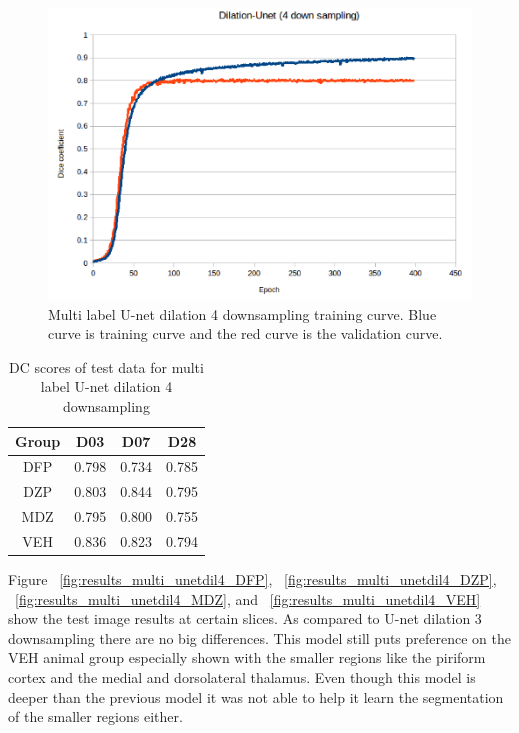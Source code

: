 \begin{figure}[!tbh]
\centering
\includegraphics[width=\textwidth]{results/train_results_multi_unetdil4.png}
\caption{Multi label U-net dilation 4 downsampling training curve. Blue curve is training curve and the red curve is the validation curve. }
\label{fig:results_multi_unetdil4_train}
\end{figure}

\begin{table}[tbh]
\renewcommand{\arraystretch}{1}
\centering
\begin{tabular}{|c|c|c|c|}
\hline
\textbf{Group} & \textbf{D03}& \textbf{D07}& \textbf{D28}\\
\hline
DFP & 0.798 & 0.734 & 0.785\\      
\hline
DZP & 0.803 & 0.844 & 0.795\\
\hline
MDZ & 0.795 & 0.800 & 0.755\\ 
\hline
VEH & 0.836 & 0.823 & 0.794\\ 
\hline
\end{tabular}
\caption{DC scores of test data for multi label U-net dilation 4 downsampling}
\label{tab.multi_model_results_unetdil4}
\end{table}


Figure ~\ref{fig:results_multi_unetdil4_DFP}, ~\ref{fig:results_multi_unetdil4_DZP}, ~\ref{fig:results_multi_unetdil4_MDZ}, and ~\ref{fig:results_multi_unetdil4_VEH} show the test image results at certain slices. 
As compared to U-net dilation 3 downsampling there are no big differences. 
This model still puts preference on the VEH animal group especially shown with the smaller regions like the piriform cortex and the medial and dorsolateral thalamus.
Even though this model is deeper than the previous model it was not able to help it learn the segmentation of the smaller regions either. 



